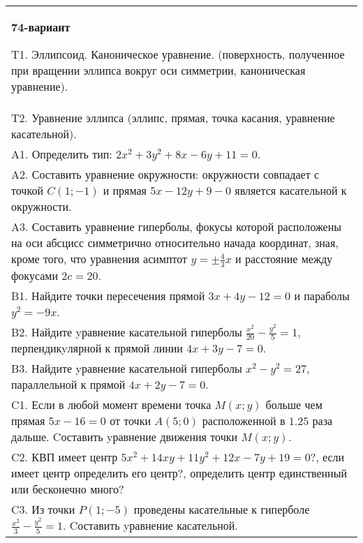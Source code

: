 \documentclass{article}
\begin{document}
\begin{tabular}{m{17cm}}
\textbf{74-вариант}
\newline

T1. Эллипсоид. Каноническое уравнение. (поверхность, полученное при вращении эллипса вокруг оси симметрии, каноническая уравнение).\\

T2. Уравнение эллипса (эллипс, прямая, точка касания, уравнение касательной).\\

A1. Определить тип: $2x^{2}+3y^{2}+8x-6y+11=0$.\\

A2. Составить уравнение окружности: окружности совпадает с точкой $C(1;-1)$ и прямая $5x-12y+9-0$ является касательной к окружности.\\

A3. Составить уравнение гиперболы, фокусы которой расположены на оси абсцисс симметрично относительно начада координат, зная, кроме того, что уравнения асимптот $y=\pm \frac{4}{3}x$ и расстояние между фокусами $2c=20$.\\

B1. Найдите точки пересечения прямой $3x + 4y - 12 = 0$ и параболы $y^{2} = - 9x$.  \\

B2. Найдите yравнение касательной гиперболы $\frac{x^{2}}{20} - \frac{y^{2}}{5} = 1$, перпендикyлярной к прямой линии $4x + 3y - 7 = 0$.  \\

B3. Найдите yравнение касательной гиперболы $x^{2} - y^{2} = 27$, параллельной к прямой $4x + 2y - 7 = 0$.  \\

C1. Если в любой момент времени точка $M(x;y)$ больше чем прямая $5x-16=0$ от точки $A(5;0)$ расположенной в $1.25$ раза дальше. Cоставить yравнение движения точки $M(x;y)$.  \\

C2. КВП имеет центр $5x^{2}+14xy+11y^{2}+12x-7y+19=0$?, если имеет центр определить его центр?, определить центр единственный или бесконечно много?  \\

C3. Из точки $P(1;-5)$ проведены касательные к гиперболе $\frac{x^{2}}{3}-\frac{y^{2}}{5}=1$. Cоставить yравнение касательной.\\

\end{tabular}
\vspace{1cm}
\end{document}
